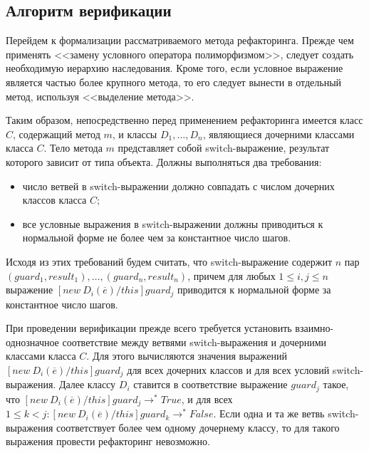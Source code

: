 \subsection{Алгоритм верификации}
Перейдем к формализации рассматриваемого метода рефакторинга. Прежде чем применять <<замену условного оператора полиморфизмом>>,
следует создать необходимую иерархию наследования. Кроме того, если условное выражение является частью более крупного метода,
то его следует вынести в отдельный метод, используя <<выделение метода>>.

Таким образом, непосредственно перед применением рефакторинга имеется класс $C$, содержащий метод $m$, и классы $D_1, \ldots, D_n$, являющиеся дочерними классами класса $C$.
Тело метода $m$ представляет собой switch-выражение, результат которого зависит от типа объекта. 
Должны выполняться два требования:
\begin{itemize}
    \item число ветвей в switch-выражении должно совпадать с числом дочерних классов класса $C$;
    \item все условные выражения в switch-выражении должны приводиться к нормальной форме не более чем за константное число шагов.
\end{itemize}
Исходя из этих требований будем считать, что switch-выражение содержит $n$ пар $(guard_1, result_1), \ldots, (guard_n, result_n)$,
причем для любых $1 \le i, j \le n$ выражение $[new\ D_i(\overline{e})/this]guard_j$ приводится к нормальной форме за константное число шагов.

При проведении верификации прежде всего требуется установить взаимно-однозначное соответствие между ветвями switch-выражения и дочерними классами класса $C$.
Для этого вычисляются значения выражений $[new\ D_i(\overline{e})/this]guard_j$ для всех дочерних классов и для всех условий switch-выражения.
Далее классу $D_i$ ставится в соответствие выражение $guard_j$ такое, что $[new\ D_i(\overline{e})/this]guard_j \rightarrow^* True$,
и для всех $1 \le k < j: [new\ D_i(\overline{e})/this]guard_k \rightarrow^* False$. Если одна и та же ветвь switch-выражения соответствует более чем одному
дочернему классу, то для такого выражения провести рефакторинг невозможно.

